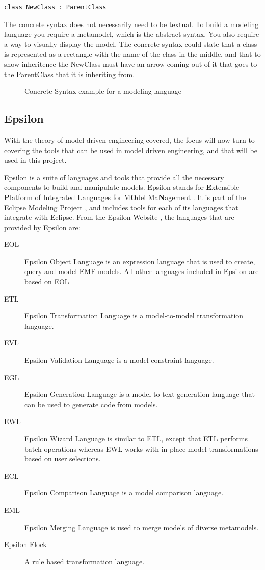 \begin{lstlisting}
class NewClass : ParentClass
\end{lstlisting}

The concrete syntax does not necessarily need to be textual. To build a modeling language you require a metamodel, which is the abstract syntax. You also require a way to visually display the model. The concrete syntax could state that a class is represented as a rectangle with the name of the class in the middle, and that to show inheritence the NewClass must have an arrow coming out of it that goes to the ParentClass that it is inheriting from.

\begin{figure}[h]
\begin{center}
	\label{concreteSyntaxFigure}
	\caption{Concrete Syntax example for a modeling language}
\end{center}
\end{figure}

\subsection{Epsilon}
With the theory of model driven engineering covered, the focus will now turn to covering the tools that can be used in model driven engineering, and that will be used in this project.

Epsilon is a suite of languages and tools that provide all the necessary components to build and manipulate models. Epsilon stands for \textbf{E}xtensible \textbf{P}latform of Integrated \textbf{L}anguages for M\textbf{O}del Ma\textbf{N}agement \citep{epsilonWebsite}. It is part of the Eclipse Modeling Project \citep{ecliplseModelingProjectSite}, and includes tools for each of its languages that integrate with Eclipse. From the Epsilon Website \citep{epsilonWebsite}, the languages that are provided by Epsilon are:

\begin{description}
\item[EOL] Epsilon Object Language is an expression language that is used to create, query and model EMF models. All other languages included in Epsilon are based on EOL \citep{epsilonBook}
\item[ETL] Epsilon Transformation Language is a model-to-model transformation language.
\item[EVL] Epsilon Validation Language is a model constraint language.
\item[EGL] Epsilon Generation Language is a model-to-text generation language that can be used to generate code from models.
\item[EWL] Epsilon Wizard Language is similar to ETL, except that ETL performs batch operations whereas EWL works with in-place model transformations based on user selections.
\item[ECL] Epsilon Comparison Language is a model comparison language.
\item[EML] Epsilon Merging Language is used to merge models of diverse metamodels.
\item[Epsilon Flock] A rule based transformation language.
\end{description}

